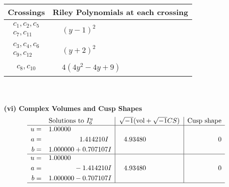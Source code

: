 \documentclass[1p]{elsarticle_modified}
\theoremstyle{definition}
\newcommand{\I}{\sqrt{-1}}
\begin{document}
\begin{tabular}{m{50pt}|m{274pt}}
Crossings & \hspace{64pt}Riley Polynomials at each crossing \\
\hline $$\begin{aligned}c_{1},c_{2},c_{5}\\c_{7},c_{11}\end{aligned}$$&$\begin{aligned}
&(y-1)^2
\end{aligned}$\\
\hline $$\begin{aligned}c_{3},c_{4},c_{6}\\c_{9},c_{12}\end{aligned}$$&$\begin{aligned}
&(y+2)^2
\end{aligned}$\\
\hline $$\begin{aligned}c_{8},c_{10}\end{aligned}$$&$\begin{aligned}
&4(4 y^2-4 y+9)
\end{aligned}$\\
\hline
\end{tabular}\\~\\
\newpage\flushleft \textbf{(vi) Complex Volumes and Cusp Shapes}
$$\begin{array}{c|c|c}  
\text{Solutions to }I^u_{6}& \I (\text{vol} + \sqrt{-1}CS) & \text{Cusp shape}\\
 \hline 
\begin{aligned}
u &= \phantom{-}1.00000\phantom{ +0.000000I} \\
a &= \phantom{-0.000000 -}1.414210 I \\
b &= \phantom{-}1.000000 + 0.707107 I\end{aligned}
 & \phantom{-}4.93480\phantom{ +0.000000I} & \phantom{-0.000000 } 0 \\ \hline\begin{aligned}
u &= \phantom{-}1.00000\phantom{ +0.000000I} \\
a &= \phantom{-0.000000 } -1.414210 I \\
b &= \phantom{-}1.000000 - 0.707107 I\end{aligned}
 & \phantom{-}4.93480\phantom{ +0.000000I} & \phantom{-0.000000 } 0\\
 \hline 
 \end{array}$$\newpage\newpage\renewcommand{\arraystretch}{1}
\end{document}
